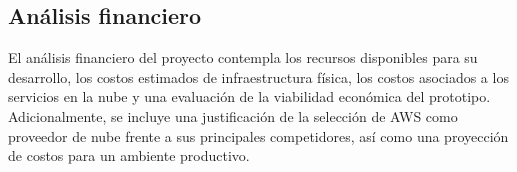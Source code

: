 \newpage
\subsection{Análisis financiero}

El análisis financiero del proyecto contempla los recursos disponibles
para su desarrollo, los costos estimados de infraestructura física,
los costos asociados a los servicios en la nube y una evaluación de
la viabilidad económica del prototipo. Adicionalmente, se incluye
una justificación de la selección de AWS como proveedor de nube frente
a sus principales competidores, así como una proyección de costos
para un ambiente productivo.